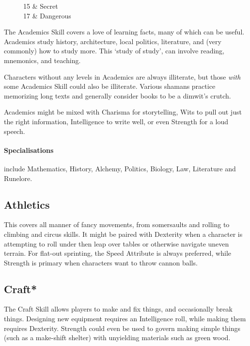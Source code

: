 \begin{multicols}{2}
\begin{wrapfigure}{R}{.2\textwidth}
\begin{rollchart}
		15 & Secret \\

		17 & Dangerous \\

	\end{rollchart}

\end{wrapfigure}

The Academics Skill covers a love of learning facts, many of which can be useful.
Academics study history, architecture, local politics, literature, and (very commonly) how to study more.
This `study of study', can involve reading, mnemonics, and teaching.

Characters without any levels in Academics are always illiterate, but those \emph{with} some Academics Skill could also be illiterate.
Various shamans practice memorizing long texts and generally consider books to be a dimwit's crutch.

Academics might be mixed with Charisma for storytelling, Wits to pull out just the right information, Intelligence to write well, or even Strength for a loud speech.

\paragraph{Specialisations} include Mathematics, History, Alchemy, Politics, Biology, Law, Literature and Runelore.

\subsection{Athletics}

This covers all manner of fancy movements, from somersaults and rolling to climbing and circus skills.
It might be paired with Dexterity when a character is attempting to roll under then leap over tables or otherwise navigate uneven terrain.
For flat-out sprinting, the Speed Attribute is always preferred, while Strength is primary when characters want to throw cannon balls.

\subsection{Craft*}

The Craft Skill allows players to make and fix things, and occasionally break things.
Designing new equipment requires an Intelligence roll, while making them requires Dexterity.
Strength could even be used to govern making simple things (such as a make-shift shelter) with unyielding materials such as green wood.


\end{multicols}
